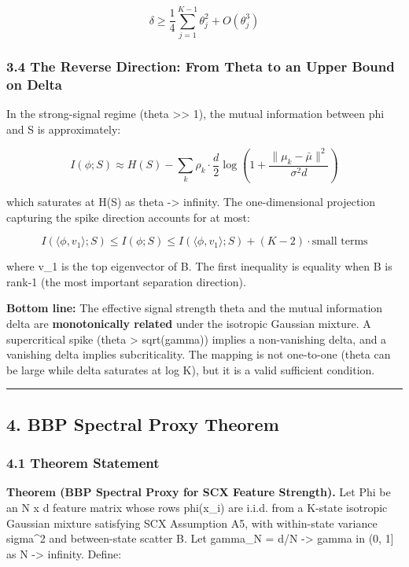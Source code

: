 \documentclass[
  12pt,
]{article}
\begin{document}
\[\delta \geq \frac{1}{4} \sum_{j=1}^{K-1} \theta_j^2 + O(\theta_j^3)\]

\subsubsection{3.4 The Reverse Direction: From Theta to an Upper Bound
on
Delta}\label{the-reverse-direction-from-theta-to-an-upper-bound-on-delta}

In the strong-signal regime (theta \textgreater\textgreater{} 1), the
mutual information between phi and S is approximately:

\[I(\phi; S) \approx H(S) - \sum_k \rho_k \cdot \frac{d}{2} \log\left(1 + \frac{\|\mu_k - \bar{\mu}\|^2}{\sigma^2 d}\right)\]

which saturates at H(S) as theta -\textgreater{} infinity. The
one-dimensional projection capturing the spike direction accounts for at
most:

\[I(\langle \phi, v_1 \rangle; S) \leq I(\phi; S) \leq I(\langle \phi, v_1 \rangle; S) + (K-2) \cdot \text{small terms}\]

where v\_1 is the top eigenvector of B. The first inequality is equality
when B is rank-1 (the most important separation direction).

\textbf{Bottom line:} The effective signal strength theta and the mutual
information delta are \textbf{monotonically related} under the isotropic
Gaussian mixture. A supercritical spike (theta \textgreater{}
sqrt(gamma)) implies a non-vanishing delta, and a vanishing delta
implies subcriticality. The mapping is not one-to-one (theta can be
large while delta saturates at log K), but it is a valid sufficient
condition.

\begin{center}\rule{0.5\linewidth}{0.5pt}\end{center}

\subsection{4. BBP Spectral Proxy
Theorem}\label{bbp-spectral-proxy-theorem}

\subsubsection{4.1 Theorem Statement}\label{theorem-statement}

\textbf{Theorem (BBP Spectral Proxy for SCX Feature Strength).} Let Phi
be an N x d feature matrix whose rows phi(x\_i) are i.i.d. from a
K-state isotropic Gaussian mixture satisfying SCX Assumption A5, with
within-state variance sigma\^{}2 and between-state scatter B. Let
gamma\_N = d/N -\textgreater{} gamma in (0, 1{]} as N -\textgreater{}
infinity. Define:
\end{document}

